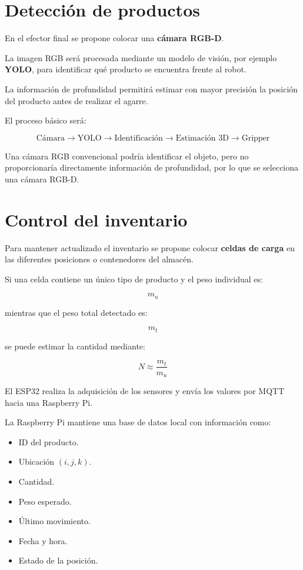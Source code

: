 \documentclass[12pt,letterpaper]{article}
\begin{document}
\section{Detección de productos}

En el efector final se propone colocar una \textbf{cámara RGB-D}.

La imagen RGB será procesada mediante un modelo de visión, por ejemplo
\textbf{YOLO}, para identificar qué producto se encuentra frente al robot.

La información de profundidad permitirá estimar con mayor precisión la
posición del producto antes de realizar el agarre.

El proceso básico será:

\[
\text{Cámara}
\rightarrow
\text{YOLO}
\rightarrow
\text{Identificación}
\rightarrow
\text{Estimación 3D}
\rightarrow
\text{Gripper}
\]

Una cámara RGB convencional podría identificar el objeto, pero no
proporcionaría directamente información de profundidad, por lo que se
selecciona una cámara RGB-D.

\section{Control del inventario}

Para mantener actualizado el inventario se propone colocar
\textbf{celdas de carga} en las diferentes posiciones o contenedores del
almacén.

Si una celda contiene un único tipo de producto y el peso individual es:

\[
m_u
\]

mientras que el peso total detectado es:

\[
m_t
\]

se puede estimar la cantidad mediante:

\[
N \approx \frac{m_t}{m_u}
\]

El ESP32 realiza la adquisición de los sensores y envía los valores por
MQTT hacia una Raspberry Pi.

La Raspberry Pi mantiene una base de datos local con información como:

\begin{itemize}[leftmargin=1.2cm]

    \item ID del producto.
    \item Ubicación $(i,j,k)$.
    \item Cantidad.
    \item Peso esperado.
    \item Último movimiento.
    \item Fecha y hora.
    \item Estado de la posición.

\end{itemize}
\end{document}
